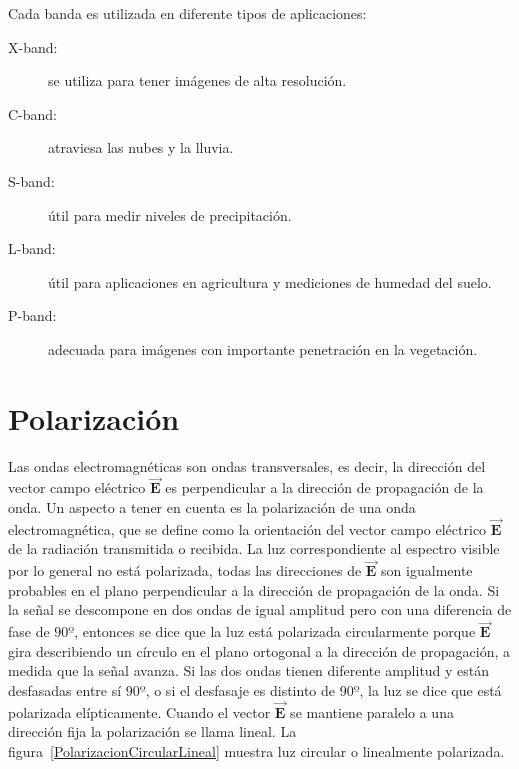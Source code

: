 Cada banda es utilizada en diferente tipos de aplicaciones:

\begin{description}
\item[X-band:] se utiliza para tener imágenes de alta resolución.
\item[C-band:] atraviesa las nubes y la lluvia.
\item[S-band:] útil para medir niveles de precipitación.
\item[L-band:] útil para aplicaciones en agricultura y mediciones de humedad del suelo.
\item[P-band:] adecuada para  imágenes con importante penetración en la vegetación.
\end{description}


\section{Polarización}

Las ondas electromagnéticas son ondas transversales, es decir, la dirección del vector campo eléctrico $\vec{\mathbf{E}}$ es perpendicular a la dirección de propagación de la onda. Un aspecto a tener en cuenta es la polarización de una onda electromagnética, que se define como la orientación del vector campo eléctrico $\vec{\mathbf{E}}$ de la radiación transmitida o recibida. La luz correspondiente al espectro visible por lo general no está polarizada, todas las direcciones de $\vec{\mathbf{E}}$ son igualmente probables en el plano perpendicular a la dirección de propagación de la onda. Si la señal se descompone en dos ondas de igual amplitud pero con una diferencia de fase de $90º$, entonces se dice que la luz está polarizada circularmente porque $\vec{\mathbf{E}}$ gira describiendo un círculo en el plano ortogonal a la dirección de propagación, a medida que la señal avanza. Si las dos ondas tienen diferente amplitud y están desfasadas entre sí $90º$, o si el desfasaje es distinto de $90º$, la luz se dice que está polarizada elípticamente. Cuando el vector $\vec{\mathbf{E}}$ se mantiene paralelo a una dirección fija la polarización se llama lineal. La figura~\ref{PolarizacionCircularLineal} muestra luz  circular o linealmente polarizada.

